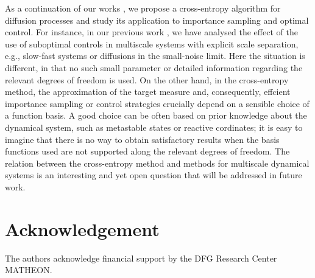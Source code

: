 \documentclass[final]{siamltex}
\begin{document}
As a continuation of our works \cite{zlph2013, zhws13}, we propose a cross-entropy
algorithm for diffusion processes and study its application to
importance sampling and optimal control.
For instance, in our previous work  \cite{zhws13}, we have analysed the effect of the use of suboptimal controls in multiscale systems with explicit scale separation, e.g., slow-fast systems or diffusions in the small-noise limit. Here the situation is different, in that no such small parameter or detailed information regarding the relevant degrees of freedom is used.  On the other hand, in the cross-entropy method, the approximation of the target measure and, consequently, effcient importance sampling or control strategies crucially depend on a sensible choice of a function basis. 
%
A good choice can be often based on prior knowledge about the dynamical
system, such as metastable states or reactive cordinates; it is easy to
imagine that there is no way to obtain satisfactory results when the basis functions used are not supported along the relevant degrees of freedom.
The relation between the cross-entropy method and methods for multiscale dynamical systems is an interesting and yet open question that will be addressed in future work.

\section*{Acknowledgement}
The authors acknowledge financial support by the DFG Research Center MATHEON.
\FloatBarrier



\end{document}
